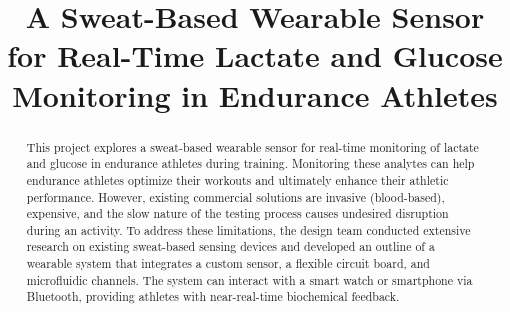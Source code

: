 \documentclass[conference]{IEEEtran}
\begin{document}
\title{A Sweat-Based Wearable Sensor for Real-Time Lactate and Glucose Monitoring in Endurance Athletes}

\medskip

\author{
\and
{}
\and
{}
}

\maketitle

\begin{abstract}
This project explores a sweat-based wearable sensor for real-time monitoring of lactate and glucose in endurance athletes during training. Monitoring these analytes can help endurance athletes optimize their workouts and ultimately enhance their athletic performance. However, existing commercial solutions are invasive (blood-based), expensive, and the slow nature of the testing process causes undesired disruption during an activity. To address these limitations, the design team conducted extensive research on existing sweat-based sensing devices and developed an outline of a wearable system that integrates a custom sensor, a flexible circuit board, and microfluidic channels. The system can interact with a smart watch or smartphone via Bluetooth, providing athletes with near-real-time biochemical feedback.
\end{abstract}

\smallskip
\end{document}
